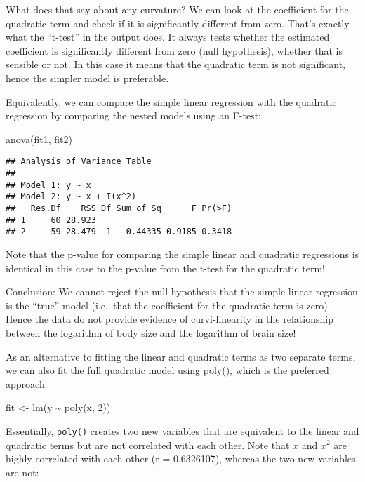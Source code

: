 \documentclass[
]{article}
\newenvironment{Shaded}{\begin{snugshade}}{\end{snugshade}}
\newcommand{\DecValTok}[1]{\textcolor[rgb]{0.00,0.00,0.81}{#1}}
\newcommand{\FunctionTok}[1]{\textcolor[rgb]{0.00,0.00,0.00}{#1}}
\newcommand{\NormalTok}[1]{#1}
\newcommand{\OtherTok}[1]{\textcolor[rgb]{0.56,0.35,0.01}{#1}}
\newcommand{\SpecialCharTok}[1]{\textcolor[rgb]{0.00,0.00,0.00}{#1}}
\begin{document}
What does that say about any curvature? We can look at the coefficient
for the quadratic term and check if it is significantly different from
zero. That's exactly what the ``t-test'' in the output does. It always
tests whether the estimated coefficient is significantly different from
zero (null hypothesis), whether that is sensible or not. In this case it
means that the quadratic term is not significant, hence the simpler
model is preferable.

Equivalently, we can compare the simple linear regression with the
quadratic regression by comparing the nested models using an F-test:

\begin{Shaded}
\begin{Highlighting}[]
\FunctionTok{anova}\NormalTok{(fit1, fit2)}
\end{Highlighting}
\end{Shaded}

\begin{verbatim}
## Analysis of Variance Table
## 
## Model 1: y ~ x
## Model 2: y ~ x + I(x^2)
##   Res.Df    RSS Df Sum of Sq      F Pr(>F)
## 1     60 28.923                           
## 2     59 28.479  1   0.44335 0.9185 0.3418
\end{verbatim}

Note that the p-value for comparing the simple linear and quadratic
regressions is identical in this case to the p-value from the t-test for
the quadratic term!

Conclusion: We cannot reject the null hypothesis that the simple linear
regression is the ``true'' model (i.e.~that the coefficient for the
quadratic term is zero). Hence the data do not provide evidence of
curvi-linearity in the relationship between the logarithm of body size
and the logarithm of brain size!

As an alternative to fitting the linear and quadratic terms as two
separate terms, we can also fit the full quadratic model using poly(),
which is the preferred approach:

\begin{Shaded}
\begin{Highlighting}[]
\NormalTok{fit }\OtherTok{\textless{}{-}} \FunctionTok{lm}\NormalTok{(y }\SpecialCharTok{\textasciitilde{}} \FunctionTok{poly}\NormalTok{(x, }\DecValTok{2}\NormalTok{))}
\end{Highlighting}
\end{Shaded}

Essentially, \texttt{poly()} creates two new variables that are
equivalent to the linear and quadratic terms but are not correlated with
each other. Note that \(x\) and \(x^{2}\) are highly correlated with
each other (r = 0.6326107), whereas the two new variables are not:
\end{document}
